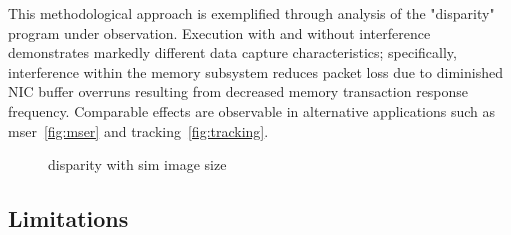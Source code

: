 
This methodological approach is exemplified through analysis of the "disparity" program under observation. Execution with and without interference demonstrates markedly different data capture characteristics; specifically, interference within the memory subsystem reduces packet loss due to diminished NIC buffer overruns resulting from decreased memory transaction response frequency. Comparable effects are observable in alternative applications such as mser~\ref{fig:mser} and tracking~\ref{fig:tracking}.




\begin{figure}%
  \centering
  \qquad
  \caption{disparity with sim image size}%
  \label{fig:disparity}%
\end{figure}


\subsection{Limitations}

